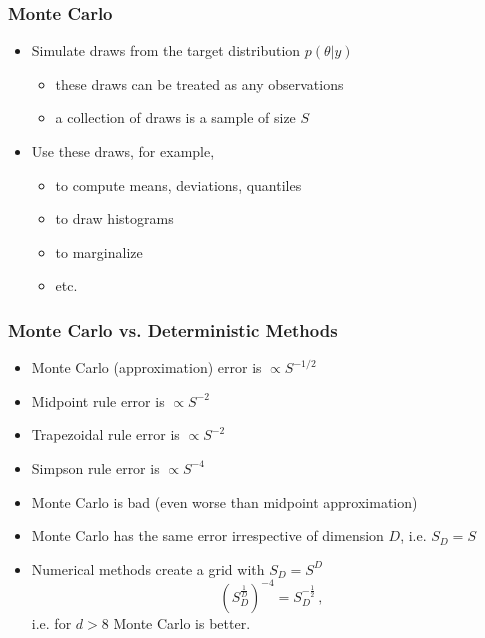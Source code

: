 \documentclass[10pt]{beamer}
\begin{document}
\begin{frame}

\frametitle{Monte Carlo}

  \begin{itemize}
  \item Simulate draws from the target distribution $p(\theta|y)$
    \begin{itemize}
    \item these draws can be treated as any observations
    \item a collection of draws is a sample of size $S$
    \end{itemize}
    \pause
  \item Use these draws, for example,
    \begin{itemize}
    \item to compute means, deviations, quantiles
    \item to draw histograms
    \item to marginalize
    \item etc.
    \end{itemize}
  \end{itemize}

\end{frame}

\begin{frame}


\frametitle{Monte Carlo vs. Deterministic Methods}

  \begin{itemize}
  \item Monte Carlo (approximation) error is $\propto S^{-1/2}$
  \item Midpoint rule error is $\propto S^{-2}$
  \item Trapezoidal rule error is $\propto S^{-2}$
  \item Simpson rule error is $\propto S^{-4}$
  \item Monte Carlo is bad (even worse than midpoint approximation)
  \pause
  \item Monte Carlo has the same error irrespective of dimension $D$, i.e. $S_D = S$
  \item Numerical methods create a grid with $S_D = S^D$
  \pause
  \[
  (S_D^\frac{1}{D})^{-4} = S_D^{-\frac{1}{2}}\,,
  \]
  i.e. for $d > 8$ Monte Carlo is better.
  \end{itemize}

\end{frame}
\end{document}
